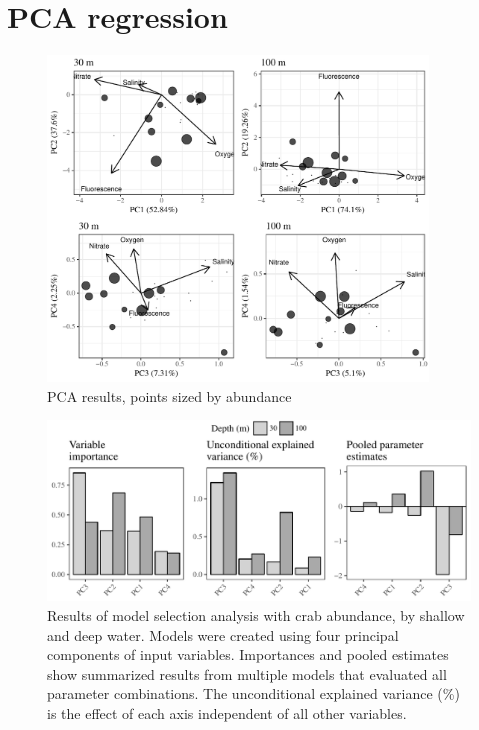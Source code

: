 \documentclass[letterpaper,12pt]{article}\usepackage[]{graphicx}\usepackage[]{color}
\makeatletter
\def\maxwidth{ %
  \ifdim\Gin@nat@width>\linewidth
    \linewidth
  \else
    \Gin@nat@width
  \fi
}
\newenvironment{knitrout}{}{} %
\makeatother
\begin{document}
\section{PCA regression}

\begin{knitrout}
\color{fgcolor}\begin{figure}[!h]
\includegraphics[width=0.9\textwidth]{figure/unnamed-chunk-8-1} \caption[PCA results, points sized by abundance]{PCA results, points sized by abundance}\label{fig:unnamed-chunk-8}
\end{figure}


\end{knitrout}



\begin{knitrout}
\color{fgcolor}\begin{figure}
\includegraphics[width=\maxwidth]{figure/unnamed-chunk-10-1} \caption[Results of model selection analysis with crab abundance, by shallow and deep water]{Results of model selection analysis with crab abundance, by shallow and deep water. Models were created using four principal components of input variables. Importances and pooled estimates show summarized results from multiple models that evaluated all parameter combinations.  The unconditional explained variance (\%) is the effect of each axis independent of all other variables.}\label{fig:unnamed-chunk-10}
\end{figure}


\end{knitrout}
\end{document}
